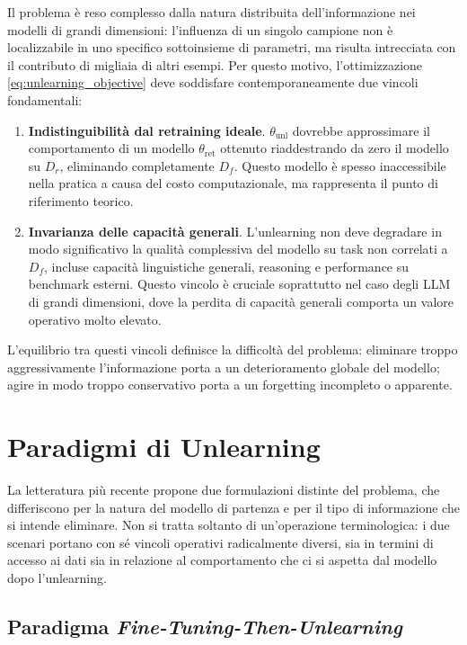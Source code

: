 Il problema è reso complesso dalla natura distribuita dell’informazione nei modelli di grandi dimensioni: l’influenza di un singolo campione non è localizzabile in uno specifico sottoinsieme di parametri, ma risulta intrecciata con il contributo di migliaia di altri esempi. Per questo motivo, l’ottimizzazione \eqref{eq:unlearning_objective} deve soddisfare contemporaneamente due vincoli fondamentali:
\begin{enumerate}
    \item \textbf{Indistinguibilità dal retraining ideale}.  
    $\theta_{\mathrm{unl}}$ dovrebbe approssimare il comportamento di un modello $\theta_{\mathrm{ret}}$ ottenuto riaddestrando da zero il modello su $D_r$, eliminando completamente $D_f$. Questo
 modello è spesso inaccessibile nella pratica a causa del costo computazionale, ma rappresenta il punto di riferimento teorico.
    
    \item \textbf{Invarianza delle capacità generali}.  
    L’unlearning non deve degradare in modo significativo la qualità complessiva del modello su task non correlati a $D_f$, incluse capacità linguistiche generali, reasoning e performance su benchmark esterni. Questo vincolo è cruciale soprattutto nel caso degli LLM di grandi dimensioni, dove la perdita di capacità generali comporta un valore operativo molto elevato.
\end{enumerate}

L'equilibrio tra questi vincoli definisce la difficoltà del problema: eliminare troppo aggressivamente l’informazione porta a un deterioramento globale del modello; agire in modo troppo conservativo porta a un forgetting incompleto o apparente.

\section{Paradigmi di Unlearning}

La letteratura più recente \cite{geng2025comprehensivesurveymachineunlearning} propone due formulazioni distinte del problema, che differiscono per la natura del modello di partenza e per il tipo di informazione che si intende eliminare. Non si tratta soltanto di un’operazione terminologica: i due scenari portano con sé vincoli operativi radicalmente diversi, sia in termini di accesso ai dati sia in relazione al comportamento che ci si aspetta dal modello dopo l’unlearning.

\subsection{Paradigma \emph{Fine-Tuning-Then-Unlearning}}

